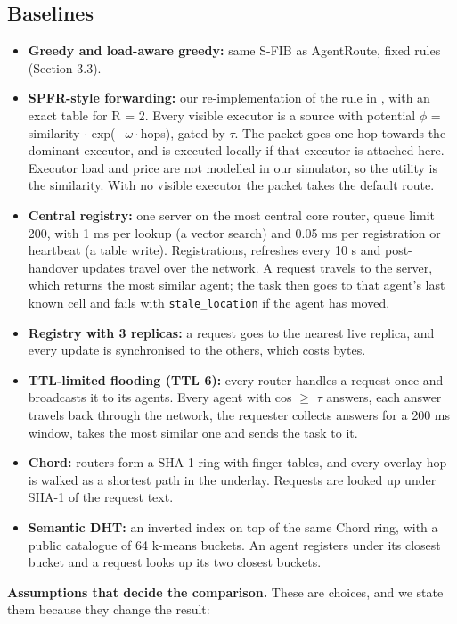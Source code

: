 \documentclass[journal]{IEEEtran}
\begin{document}
\subsection{Baselines}
\begin{itemize}
\item \textbf{Greedy and load-aware greedy:} same S-FIB as AgentRoute, fixed rules (Section 3.3).
\item \textbf{SPFR-style forwarding:} our re-implementation of the rule in \cite{ref2}, with an exact table for R = 2. Every visible executor is a source with potential $\phi$ = similarity $\cdot$ exp($-\omega\cdot$hops), gated by $\tau$. The packet goes one hop towards the dominant executor, and is executed locally if that executor is attached here. Executor load and price are not modelled in our simulator, so the utility is the similarity. With no visible executor the packet takes the default route.
\item \textbf{Central registry:} one server on the most central core router, queue limit 200, with 1 ms per lookup (a vector search) and 0.05 ms per registration or heartbeat (a table write). Registrations, refreshes every 10 s and post-handover updates travel over the network. A request travels to the server, which returns the most similar agent; the task then goes to that agent's last known cell and fails with \texttt{stale\_\allowbreak location} if the agent has moved.
\item \textbf{Registry with 3 replicas:} a request goes to the nearest live replica, and every update is synchronised to the others, which costs bytes.
\item \textbf{TTL-limited flooding (TTL 6):} every router handles a request once and broadcasts it to its agents. Every agent with cos $\geq$ $\tau$ answers, each answer travels back through the network, the requester collects answers for a 200 ms window, takes the most similar one and sends the task to it.
\item \textbf{Chord:} routers form a SHA-1 ring with finger tables, and every overlay hop is walked as a shortest path in the underlay. Requests are looked up under SHA-1 of the request text.
\item \textbf{Semantic DHT:} an inverted index on top of the same Chord ring, with a public catalogue of 64 k-means buckets. An agent registers under its closest bucket and a request looks up its two closest buckets.
\end{itemize}

\textbf{Assumptions that decide the comparison.} These are choices, and we state them because they change the result:
\end{document}
